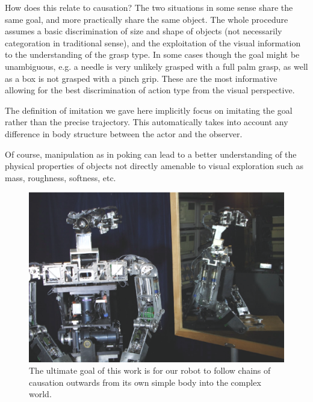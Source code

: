 \ifverbose
How does this relate to causation?  The two situations in some sense
share the same goal, and more practically share the same object.  The
whole procedure assumes a basic discrimination of size and shape of
objects (not necessarily categor\iz{}ation in traditional sense), and the
exploitation of the visual information to the understanding of the
grasp type. In some cases though the goal might be unambiguous, e.g. a
needle is very unlikely grasped with a full palm grasp, as well as a
box is not grasped with a pinch grip. These are the most informative
allowing for the best discrimination of action type from the visual
perspective.
\fi

\ifverbose
The definition of imitation we gave here implicitly focus on imitating
the goal rather than the precise trajectory. This automatically takes
into account any difference in body structure between the actor and
the observer.

Of course, manipulation as in poking can lead to a better
understanding of the physical properties of objects not directly
amenable to visual exploration such as mass, roughness, softness, etc.
\fi

\ifverbose
\begin{figure}[tbh]
\begin{center}
\includegraphics[width=\columnwidth]{mirror-cog.eps}
\caption{ 
\label{fig:mirror-cog}
%
The ultimate goal of this work is for our robot to follow chains of
causation outwards from its own simple body into the complex world.
%
}
\end{center}
\end{figure}
\fi
